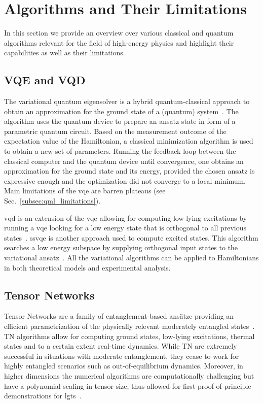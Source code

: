 \section{Algorithms and Their Limitations\label{app:algos_limits}}

In this section we provide an overview over various classical and quantum algorithms relevant for the field of high-energy physics and highlight their capabilities as well as their limitations.

\subsection{VQE and VQD}

The variational quantum eigensolver is a hybrid quantum-classical approach to obtain an approximation for the ground state of a (quantum) system~\cite{Peruzzo2014}. The algorithm uses the quantum device to prepare an ansatz state in form of a parametric quantum circuit. Based on the measurement outcome of the expectation value of the Hamiltonian, a classical minimization algorithm is used to obtain a new set of parameters. Running the feedback loop between the classical computer and the quantum device until convergence, one obtains an approximation for the ground state and its energy, provided the chosen ansatz is expressive enough and the optimization did not converge to a local minimum. Main limitations of the \acrshort{vqe} are barren plateaus (see Sec.~\ref{subsec:qml_limitations}). 

\gls{vqd} is an extension of the \gls{vqe} allowing for computing low-lying excitations by running a \gls{vqe} looking for a low energy state that is orthogonal to all previous states~\cite{Higgott2019}.  
\gls{ssvqe} is another approach used to compute excited states. This algorithm searches a low energy
subspace by supplying orthogonal input states to the variational ansatz~\cite{PhysRevResearch.1.033062}. All the variational algorithms can be applied to Hamiltonians in both theoretical models and experimental analysis.

\subsection{Tensor Networks}

Tensor Networks are a family of entanglement-based ansätze providing an efficient parametrization of the physically relevant moderately entangled states~\cite{Banuls2019SimulatingLG,Banuls2020TNreview}. TN algorithms allow for computing ground states, low-lying excitations, thermal states and to a certain extent real-time dynamics. While TN are extremely successful in situations with moderate entanglement, they cease to work for highly entangled scenarios such as out-of-equilibrium dynamics. Moreover, in higher dimensions the numerical algorithms are computationally challenging but have a polynomial scaling in tensor size, thus allowed for first proof-of-principle demonstrations for \acrshort{lgt}s~\cite{Felser2019,Magnifico2020}.

